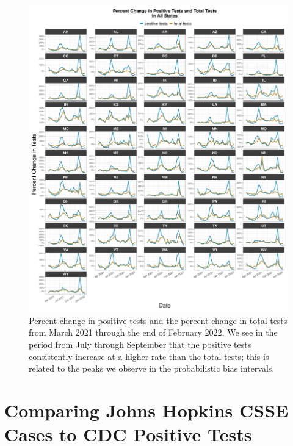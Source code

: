 \documentclass[12pt,twoside]{smiththesis}
\begin{document}
\begin{figure}

{\centering \includegraphics[width=1\linewidth]{figure/test_capacity_all_states} 

}

\caption{\label{fig:test-capacity-all-states} Percent change in positive tests and the percent change in total tests from March 2021 through the end of February 2022. We see in the period from July through September that the positive tests consistently increase at a higher rate than the total tests; this is related to the peaks we observe in the probabilistic bias intervals.}\label{fig:unnamed-chunk-107}
\end{figure}
\hypertarget{comparing-johns-hopkins-csse-cases-to-cdc-positive-tests}{%
\section{Comparing Johns Hopkins CSSE Cases to CDC Positive Tests}\label{comparing-johns-hopkins-csse-cases-to-cdc-positive-tests}}
\end{document}
